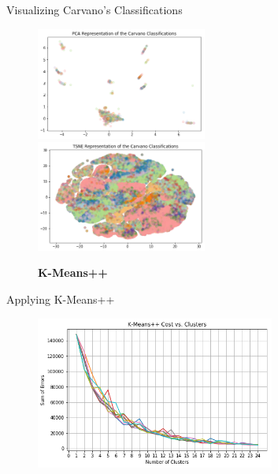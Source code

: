 \documentclass[10pt,xcolor={table,dvipsnames},t]{beamer}
\begin{document}
\begin{frame}{Visualizing Carvano's Classifications}
\begin{figure}
\begin{center}
    \includegraphics[width=0.5\textwidth]{images/carvano_pca.png}
    \includegraphics[width=0.5\textwidth]{images/carvano_tsne.png}
\end{center}
\end{figure}
\end{frame}

\begin{frame}
\begin{figure}
\vspace*{9em}
\Huge \textbf{K-Means++}
\hline
\vspace*{\fill}
\end{figure}
\end{frame}

\begin{frame}{Applying K-Means++}
\begin{figure}
\begin{center}
    \includegraphics[width=0.7\textwidth]{images/kmeans-elbow.png}
\end{center}
\end{figure}
\end{frame}
\end{document}
